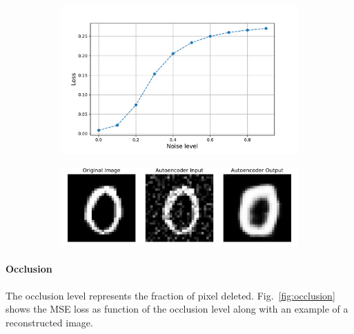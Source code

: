 \documentclass[a4paper,11pt]{article}
\begin{document}
\begin{figure}[htp]
  \centering
  \caption{MSE loss as function of the noise level and example of the autoencoder reconstruction.}
  \label{fig:noise}
  \begin{subfigure}[c]{.45\linewidth}
    \includegraphics[width=\linewidth]{../noise/loss.pdf}
  \end{subfigure}
  \begin{subfigure}[c]{.45\linewidth}
    \includegraphics[width=\linewidth]{../noise/02.pdf}
  \end{subfigure}
\end{figure}

\paragraph{Occlusion} The occlusion level represents the fraction of pixel deleted. Fig.~\ref{fig:occlusion} shows the MSE loss as function of the occlusion level along with an example of a reconstructed image.
\end{document}
